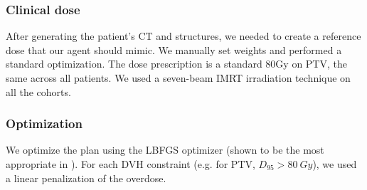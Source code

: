 \subsubsection*{Clinical dose}
After generating the patient's CT and structures, we needed to create a reference dose that our agent should mimic.
We manually set weights and performed a standard optimization.
The dose prescription is a standard 80Gy on PTV, the same across all patients.
We used a seven-beam IMRT irradiation technique on all the cohorts.


\subsubsection*{Optimization}
We optimize the plan using the LBFGS optimizer (shown to be the most appropriate in \cite{dubois_radiotherapy_2023}).
For each DVH constraint (e.g. for PTV, $D_{95}>80 \ Gy$), we used a linear penalization of the overdose.
